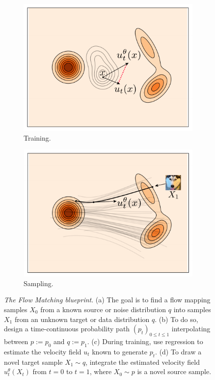 \documentclass{fairmeta}
\numberwithin{equation}{section}
\begin{document}
\begin{figure}
\begin{subfigure}[b]{0.24\textwidth}
\includegraphics[width=\textwidth]{assets/recepie/match_pt.pdf}
\caption{Training.}
\label{fig:blueprint:training}
\end{subfigure}
\hfill
\begin{subfigure}[b]{0.24\textwidth}
\includegraphics[width=\textwidth]{assets/recepie/fm_recepie_4.pdf}
\caption{Sampling.}
\label{fig:blueprint:sampling}
\end{subfigure}
\caption{\emph{The Flow Matching blueprint}.
(a) The goal is to find a flow mapping samples $X_0$ from a known source or noise distribution $q$ into samples $X_1$ from an unknown target or data distribution $q$.
(b) To do so, design a time-continuous probability path $(p_t)_{0\leq t \leq 1}$ interpolating between $p := p_0$ and $q := p_1$.
(c) During training, use regression to estimate the velocity field $u_t$ known to generate $p_t$.
(d) To draw a novel target sample $X_1 \sim q$, integrate the estimated velocity field $u^\theta_t(X_t)$ from $t=0$ to $t=1$, where $X_0 \sim p$ is a novel source sample.
  }
\label{fig:blueprint}
\end{figure}
\end{document}
